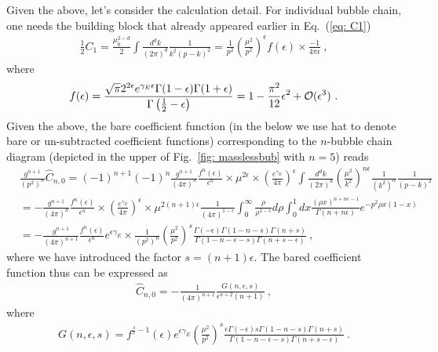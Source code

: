 \documentclass[a4paper,11pt]{article}
\begin{document}
Given the above, let's consider the calculation detail. For individual bubble chain, one needs the building block that already appeared earlier in Eq.~(\ref{eq: C1})
\begin{align}
\frac{1}{2}C_1=\frac{\mu_0^{2-d}}{2}\int \frac{d^dk}{(2\pi)^d}\frac{1}{k^2(p-k)^2}=\frac{1}{p^2}\left(\frac{\mu^2}{p^2}\right)^{\epsilon}f(\epsilon)\times \frac{-1}{4\pi \epsilon} \ , 
\end{align}
where
\begin{align}\label{eq:fe}
f(\epsilon)=\frac{\sqrt{\pi } 2^{2 \epsilon} e^{\gamma_E  \epsilon} \Gamma (1-\epsilon) \Gamma (1+\epsilon)}{\Gamma \left(\frac{1}{2}-\epsilon\right)}=1-\frac{\pi^2}{12}\epsilon^2+{\cal O}(\epsilon^3) \ .
\end{align}
Given the above, the bare coefficient function (in the below we use hat to denote bare or un-subtracted coefficient functions) corresponding to the $n$-bubble chain diagram (depicted in the upper of Fig.~\ref{fig: masslessbub} with $n=5$) reads
\begin{align}
&\frac{g^{n+1}}{(p^2)^{n}}\hat C_{n,0}=(-1)^{n+1}(-1)^n\frac{g^{n+1}}{(4\pi)^n}\frac{f^n(\epsilon)}{\epsilon^n}\times \mu^{2\epsilon}\times\left(\frac{e^{\gamma_E}}{4\pi}\right)^{\epsilon}\int\frac{d^dk}{(2\pi)^d}\left(\frac{\mu^2}{k^2}\right)^{n\epsilon}\frac{1}{(k^2)^n}\frac{1}{(p-k)^2} \nonumber \\ 
&=-\frac{g^{n+1}}{(4\pi)^n}\frac{f^n(\epsilon)}{\epsilon^n}\times\left(\frac{e^{\gamma_E}}{4\pi}\right)^{\epsilon}\times \mu^{2(n+1)\epsilon}\frac{1}{(4\pi)^{1-\epsilon}}\int_0^\infty \frac{\rho}{\rho^{1-\epsilon}} d\rho\int_0^1dx \frac{(\rho x)^{n+n\epsilon-1}}{\Gamma(n+n\epsilon)}e^{-p^2\rho x(1-x)} \nonumber \\ 
&=-\frac{g^{n+1}}{(4\pi)^{n+1}}\frac{f^n(\epsilon)}{\epsilon^n}e^{\epsilon\gamma_E}\times \frac{1}{(p^2)^n}\left(\frac{\mu^2}{p^2}\right)^s\frac{\Gamma (-\epsilon)  \Gamma (1-n-s) \Gamma (n+s)}{\Gamma (1-n-\epsilon-s) \Gamma (n+s-\epsilon)} \ ,
\end{align}
where we have introduced the factor $s=(n+1)\epsilon$. The bared coefficient function thus can be expressed as 
\begin{align}
 \hat C_{n,0}=  -\frac{1}{(4\pi)^{n+1}}\frac{G(n,\epsilon,s)}{\epsilon^{n+2}(n+1)} \ , 
\end{align}
where
\begin{align}
G(n,\epsilon,s)=f^{\frac{s}{\epsilon}-1}(\epsilon)e^{\epsilon\gamma_E}\left(\frac{\mu^2}{p^2}\right)^s\frac{\epsilon\Gamma (-\epsilon)  s\Gamma (1-n-s) \Gamma (n+s)}{\Gamma (1-n-\epsilon-s) \Gamma (n+s-\epsilon)}  \ .
\end{align}
\end{document}
